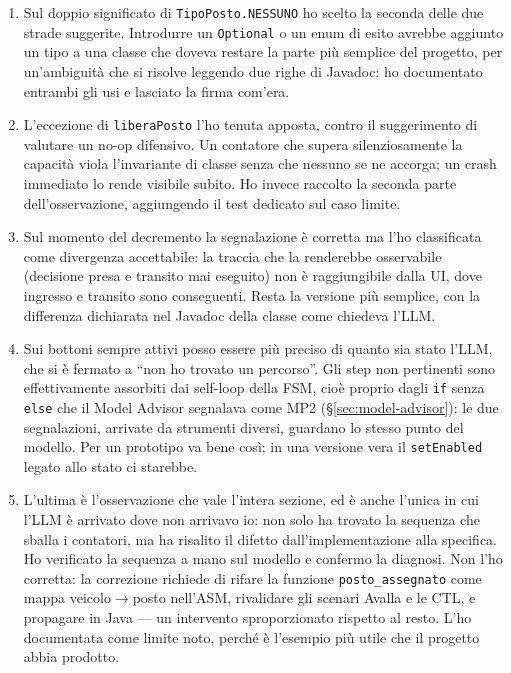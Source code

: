 \begin{enumerate}
    \item Sul doppio significato di \texttt{TipoPosto.NESSUNO} ho scelto la seconda
    delle due strade suggerite. Introdurre un \texttt{Optional} o un enum di esito
    avrebbe aggiunto un tipo a una classe che doveva restare la parte più semplice del
    progetto, per un'ambiguità che si risolve leggendo due righe di Javadoc: ho
    documentato entrambi gli usi e lasciato la firma com'era.

    \item L'eccezione di \texttt{liberaPosto} l'ho tenuta apposta, contro il
    suggerimento di valutare un no-op difensivo. Un contatore che supera silenziosamente
    la capacità viola l'invariante di classe senza che nessuno se ne accorga; un crash
    immediato lo rende visibile subito. Ho invece raccolto la seconda parte
    dell'osservazione, aggiungendo il test dedicato sul caso limite.

    \item Sul momento del decremento la segnalazione è corretta ma l'ho classificata
    come divergenza accettabile: la traccia che la renderebbe osservabile (decisione
    presa e transito mai eseguito) non è raggiungibile dalla UI, dove ingresso e
    transito sono conseguenti. Resta la versione più semplice, con la differenza
    dichiarata nel Javadoc della classe come chiedeva l'LLM.

    \item Sui bottoni sempre attivi posso essere più preciso di quanto sia stato l'LLM,
    che si è fermato a ``non ho trovato un percorso''. Gli step non pertinenti sono
    effettivamente assorbiti dai self-loop della FSM, cioè proprio dagli \texttt{if}
    senza \texttt{else} che il Model Advisor segnalava come MP2
    (\S\ref{sec:model-advisor}): le due segnalazioni, arrivate da strumenti diversi,
    guardano lo stesso punto del modello. Per un prototipo va bene così; in una versione
    vera il \texttt{setEnabled} legato allo stato ci starebbe.

    \item L'ultima è l'osservazione che vale l'intera sezione, ed è anche l'unica in cui
    l'LLM è arrivato dove non arrivavo io: non solo ha trovato la sequenza che sballa i
    contatori, ma ha risalito il difetto dall'implementazione alla specifica. Ho
    verificato la sequenza a mano sul modello e confermo la diagnosi. Non l'ho corretta:
    la correzione richiede di rifare la funzione \texttt{posto\_assegnato} come mappa
    veicolo$\to$posto nell'ASM, rivalidare gli scenari Avalla e le CTL, e propagare in
    Java — un intervento sproporzionato rispetto al resto. L'ho documentata come limite
    noto, perché è l'esempio più utile che il progetto abbia prodotto.
\end{enumerate}

